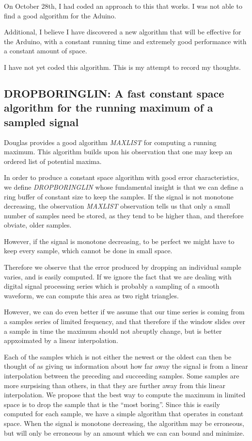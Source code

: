 \documentclass[11pt]{article}
\begin{document}
On October 28th, I had coded an approach to this that works.  I was not
able to find a good algorithm for the Aduino.

Additional, I believe I have discovered a new algorithm that will
be effective for the Arduino, with a constant running time and
extremely good performance with a constant amount of space.

I have not yet coded this algorithm. This is my attempt to record my thoughts.

\subsection{DROPBORINGLIN: A fast constant space algorithm for the running maximum of a sampled signal }

Douglas \cite{douglas1996running} provides a good algorithm {\em MAXLIST} for computing a
running maximum. This algorithm builds upon his observation that one may
keep an ordered list of potential maxima.

In order to produce a constant space algorithm with good error
characteristics, we define {\em DROPBORINGLIN} whose fundamental insight
is that we can define a ring buffer of constant size to keep the samples.
If the signal is not monotone decreasing, the observation {\em MAXLIST} observation
tells us that only a small number of samples need be stored, as they tend
to be higher than, and therefore obviate, older samples.

However, if the signal is monotone decreasing, to be perfect we might
have to keep every sample, which cannot be done in small space.

Therefore we observe that the error produced by dropping an individual
sample varies, and is easily computed. If we ignore the fact that
we are dealing with  digital signal processing series which is probably
a sampling of a smooth waveform, we can compute this area as two right triangles.

However, we can do even better if we assume that our time series is coming
from a samples series of limited frequency, and that therefore if the window
slides over a sample in time the maximum should not abruptly change, but is
better appxoimated by a linear interpolation.

Each of the samples which is not either the newest or the oldest can
then be thought of as giving us information about how far away
the signal is from a linear interpolation between the preceding and
succeeding samples. Some samples are more surpsising than others,
in that they are further away from this linear interpolation. We
propose that the best way to compute the maximum in limited space
is to drop the sample that is the ``most boring''. Since this
is easily computed for each sample, we have a simple algorithm that
operates in constant space. When the signal is monotone decreasing,
the algorithm may be erroneous, but will only be erroneous by
an amount which we can can bound and minimize.
\end{document}
